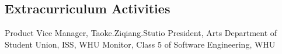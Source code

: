 \documentclass[letterpaper]{twentysecondcv} %
\begin{document}
\begin{CJK*}{UTF8}{gbsn}
\section{Extracurriculum Activities}

\begin{twentyshort}
		{\quad Product Vice Manager, Taoke.Ziqiang.Stutio}
		{\quad President, Arts Department of Student Union, ISS, WHU}
		{\quad Monitor, Class 5 of Software Engineering, WHU}
\end{twentyshort}










\end{CJK*}
\end{document}
